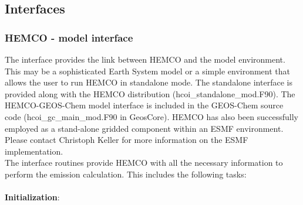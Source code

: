\documentclass[12pt,a4paper]{article} %
\begin{document}
\subsection{Interfaces} \label{bts_interfaces}
\subsubsection{HEMCO - model interface}
The interface provides the link between HEMCO and the model environment. This may be a sophisticated Earth System model or a simple environment that allows the user to run HEMCO in standalone mode. The standalone interface is provided along with the HEMCO distribution (hcoi\_standalone\_mod.F90). The HEMCO-GEOS-Chem model interface is included in the GEOS-Chem source code (hcoi\_gc\_main\_mod.F90 in GeosCore). HEMCO has also been successfully employed as a stand-alone gridded component within an ESMF environment. Please contact Christoph Keller for more information on the ESMF implementation.\\
The interface routines provide HEMCO with all the necessary information to perform the emission calculation. This includes the following tasks:\\
\\
\textbf{Initialization}:
\end{document}
